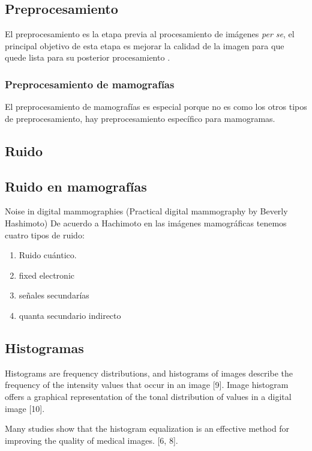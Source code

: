 \subsection{Preprocesamiento}
El preprocesamiento es la etapa previa al procesamiento de imágenes \textit{per
se}, el principal objetivo de esta etapa es mejorar la calidad de la imagen
para que quede lista para su posterior procesamiento \cite{ponraj2011survey}.

\subsubsection{Preprocesamiento de mamografías}
El preprocesamiento de mamografías es especial porque no es como los otros tipos
de preprocesamiento, hay preprocesamiento específico para mamogramas.

\subsection{Ruido}

\subsection{Ruido en mamografías}
Noise in digital mammographies (Practical digital mammography by Beverly
Hashimoto) De acuerdo a Hachimoto en las imágenes mamográficas tenemos cuatro
tipos de ruido:

\begin{enumerate}
    \item Ruido cuántico.
    \item fixed electronic
    \item señales secundarías
    \item quanta secundario indirecto
\end{enumerate}

\subsection{Histogramas}
Histograms are frequency distributions, and histograms of images describe the
frequency of the intensity values that occur in an image [9]. Image histogram
offers a graphical representation of the tonal distribution of values in a
digital image [10].


Many studies show that the histogram equalization is an effective method for
improving the quality of medical images. [6, 8]. 

